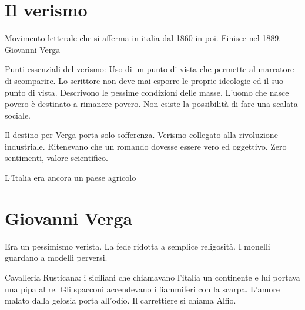 \documentclass{article}
\begin{document}
    \section{Il verismo}
    Movimento letterale che si afferma in italia dal 1860 in poi. Finisce nel 1889.
    Giovanni Verga

    Punti essenziali del verismo:
    Uso di un punto di vista che permette al marratore di scomparire. Lo scrittore non deve mai esporre le proprie ideologie ed
    il suo punto di vista. Descrivono le pessime condizioni delle masse. L'uomo che nasce povero è destinato a rimanere
    povero. Non esiste la possibilità di fare una scalata sociale.

    Il destino per Verga porta solo sofferenza.
    Verismo collegato alla rivoluzione industriale.
    Ritenevano che un romando dovesse essere vero ed oggettivo.
    Zero sentimenti, valore scientifico.

    L'Italia era ancora un paese agricolo

    \section{Giovanni Verga}

    Era un pessimismo verista. La fede ridotta a semplice religosità. I monelli guardano a modelli perversi.

    Cavalleria Rusticana: i siciliani che chiamavano l'italia un continente e lui portava una pipa al re.
    Gli spacconi accendevano i fiammiferi con la scarpa.
    L'amore malato dalla gelosia porta all'odio.
    Il carrettiere si chiama Alfio.
\end{document}
